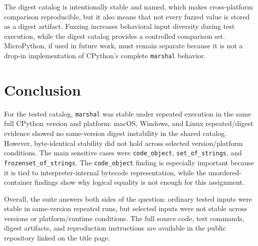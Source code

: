 \documentclass[10pt,a4paper]{article}
\begin{document}
The digest catalog is intentionally stable and named, which makes cross-platform comparison reproducible, but it also means that not every fuzzed value is stored as a digest artifact. Fuzzing increases behavioral input diversity during test execution, while the digest catalog provides a controlled comparison set. MicroPython, if used in future work, must remain separate because it is not a drop-in implementation of CPython's complete \texttt{marshal} behavior.

\section{Conclusion}

For the tested catalog, \texttt{marshal} was stable under repeated execution in the same full CPython version and platform: macOS, Windows, and Linux repeated/digest evidence showed no same-version digest instability in the shared catalog. However, byte-identical stability did not hold across selected version/platform conditions. The main sensitive cases were \texttt{code\_object}, \texttt{set\_of\_strings}, and \texttt{frozenset\_of\_strings}. The \texttt{code\_object} finding is especially important because it is tied to interpreter-internal bytecode representation, while the unordered-container findings show why logical equality is not enough for this assignment.

Overall, the suite answers both sides of the question: ordinary tested inputs were stable in same-version repeated runs, but selected inputs were not stable across versions or platform/runtime conditions. The full source code, test commands, digest artifacts, and reproduction instructions are available in the public repository linked on the title page.
\end{document}
